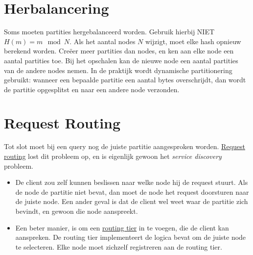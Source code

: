 	\section{Herbalancering}

	Soms moeten partities hergebalanceerd worden. Gebruik hierbij NIET $H(m) = m \mod N$. Als het aantal nodes $N$ wijzigt, moet elke hash opnieuw berekend worden. Creëer meer partities dan nodes, en ken aan elke node een aantal partities toe. Bij het opschalen kan de nieuwe node een aantal partities van de andere nodes nemen. In de praktijk wordt dynamische partitionering gebruikt: wanneer een bepaalde partitie een aantal bytes overschrijdt, dan wordt de partitie opgesplitst en naar een andere node verzonden. 

	\section{Request Routing}
	Tot slot moet bij een query nog de juiste partitie aangesproken worden. \underline{Request routing} lost dit probleem op, en is eigenlijk gewoon het \emph{service discovery} probleem. \begin{itemize}
		\item  De client zou zelf kunnen beslissen naar welke node hij de request stuurt. Als de node de partitie niet bevat, dan moet de node het request doorsturen naar de juiste node. Een ander geval is dat de client wel weet waar de partitie zich bevindt, en gewoon die node aanspreekt.
		\item  Een beter manier, is om een \underline{routing tier} in te voegen, die de client kan aanspreken. De routing tier implementeert de logica bevat om de juiste node te selecteren. Elke node moet zichzelf registreren aan de routing tier.
	\end{itemize}

	

